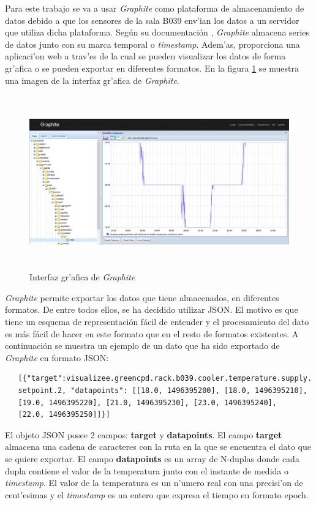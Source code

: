 	Para este trabajo se va a usar \textit{Graphite} como plataforma de almacenamiento de datos debido a que los sensores de la sala B039 env'ian los datos a un servidor que utiliza dicha plataforma. Según su documentación \cite{Graphite1}, \textit{Graphite} almacena series de datos junto con su marca temporal o \textit{timestamp}. Adem'as, proporciona una aplicaci'on web a trav'es de la cual se pueden visualizar los datos de forma gr'afica o se pueden exportar en diferentes formatos. En la figura \ref{4_3:interfaz_graphite} se muestra una imagen de la interfaz gr'afica de \textit{Graphite}.

\begin{figure}[htbp]
  \centering
  \includegraphics[width=140mm, height=75mm]{imagenes/capitulo4/4_3Interfaz_Graphite}
   \caption{Interfaz gr'afica de \textit{Graphite}}
   \label{4_3:interfaz_graphite}
\end{figure}

	\textit{Graphite} permite exportar los datos que tiene almacenados, en diferentes formatos. De entre todos ellos, se ha decidido utilizar JSON. El motivo es que tiene un esquema de representación fácil de entender y el procesamiento del dato es más fácil de hacer en este formato que en el resto de formatos existentes. A continuación se muestra un ejemplo de un dato que ha sido exportado de \textit{Graphite} en formato JSON:

\begin{verbatim}
   [{"target":visualizee.greencpd.rack.b039.cooler.temperature.supply.
   setpoint.2, "datapoints": [[18.0, 1496395200], [18.0, 1496395210], 
   [19.0, 1496395220], [21.0, 1496395230], [23.0, 1496395240], 
   [22.0, 1496395250]]}]
\end{verbatim}

	El objeto JSON posee 2 campos: \textbf{target} y \textbf{datapoints}. El campo \textbf{target} almacena una cadena de caracteres con la ruta en la que se encuentra el dato que se quiere exportar. El campo \textbf{datapoints} es un array de N-duplas donde cada dupla contiene el valor de la temperatura junto con el instante de medida o \textit{timestamp}. El valor de la temperatura es un n'umero real con una precisi'on de cent'esimas y el \textit{timestamp} es un entero que expresa el tiempo en formato epoch.

